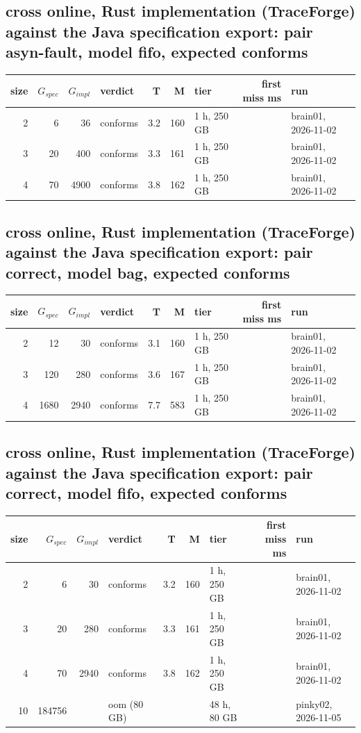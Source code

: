 \documentclass[10pt]{article}
\begin{document}
\subsection*{cross online, Rust implementation (TraceForge) against the Java specification export: pair \textsf{asyn-fault}, model fifo, expected conforms}
\begin{longtable}{@{}rrrlrrlrl@{}}
\toprule
size & $G_{\mathit{spec}}$ & $G_{\mathit{impl}}$ & verdict & T & M & tier & first miss ms & run \\
\midrule
\endhead
\color{red} 2 & 6 & 36 & conforms & 3.2 & 160 & 1 h, 250 GB &  & brain01, 2026-11-02 \\
\color{red} 3 & 20 & 400 & conforms & 3.3 & 161 & 1 h, 250 GB &  & brain01, 2026-11-02 \\
\color{red} 4 & 70 & 4900 & conforms & 3.8 & 162 & 1 h, 250 GB &  & brain01, 2026-11-02 \\
\bottomrule
\end{longtable}
\subsection*{cross online, Rust implementation (TraceForge) against the Java specification export: pair \textsf{correct}, model bag, expected conforms}
\begin{longtable}{@{}rrrlrrlrl@{}}
\toprule
size & $G_{\mathit{spec}}$ & $G_{\mathit{impl}}$ & verdict & T & M & tier & first miss ms & run \\
\midrule
\endhead
\color{red} 2 & 12 & 30 & conforms & 3.1 & 160 & 1 h, 250 GB &  & brain01, 2026-11-02 \\
\color{red} 3 & 120 & 280 & conforms & 3.6 & 167 & 1 h, 250 GB &  & brain01, 2026-11-02 \\
\color{red} 4 & 1680 & 2940 & conforms & 7.7 & 583 & 1 h, 250 GB &  & brain01, 2026-11-02 \\
\bottomrule
\end{longtable}
\subsection*{cross online, Rust implementation (TraceForge) against the Java specification export: pair \textsf{correct}, model fifo, expected conforms}
\begin{longtable}{@{}rrrlrrlrl@{}}
\toprule
size & $G_{\mathit{spec}}$ & $G_{\mathit{impl}}$ & verdict & T & M & tier & first miss ms & run \\
\midrule
\endhead
\color{red} 2 & 6 & 30 & conforms & 3.2 & 160 & 1 h, 250 GB &  & brain01, 2026-11-02 \\
\color{red} 3 & 20 & 280 & conforms & 3.3 & 161 & 1 h, 250 GB &  & brain01, 2026-11-02 \\
\color{red} 4 & 70 & 2940 & conforms & 3.8 & 162 & 1 h, 250 GB &  & brain01, 2026-11-02 \\
\color{red} 10 & 184756 &  & oom (80 GB) &  &  & 48 h, 80 GB &  & pinky02, 2026-11-05 \\
\bottomrule
\end{longtable}
\end{document}
